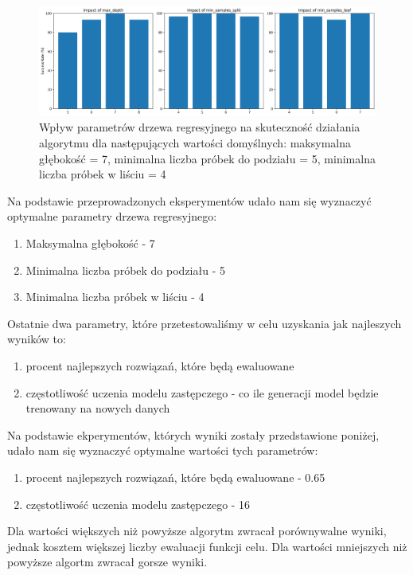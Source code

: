 \documentclass{article}
\begin{document}
\begin{figure}[H]
    \centering
    \includegraphics[width=\textwidth]{tree_parameter_tuning_separate_results3.png}
    \caption{Wpływ parametrów drzewa regresyjnego na skuteczność działania algorytmu dla następujących wartości domyślnych: maksymalna głębokość = 7, minimalna liczba próbek do podziału = 5, minimalna liczba próbek w liściu = 4}
    \label{fig:tree_parameter_results2}
\end{figure}

Na podstawie przeprowadzonych eksperymentów udało nam się wyznaczyć optymalne parametry drzewa regresyjnego:

\begin{enumerate}
    \item Maksymalna głębokość - 7
    \item Minimalna liczba próbek do podziału - 5
    \item Minimalna liczba próbek w liściu - 4
\end{enumerate}

Ostatnie dwa parametry, które przetestowaliśmy w celu uzyskania jak najleszych wyników to:
\begin{enumerate}
    \item procent najlepszych rozwiązań, które będą ewaluowane
    \item częstotliwość uczenia modelu zastępczego - co ile generacji model będzie trenowany na nowych danych
\end{enumerate}

Na podstawie ekperymentów, których wyniki zostały przedstawione poniżej, udało nam się wyznaczyć optymalne wartości tych parametrów:
\begin{enumerate}
    \item procent najlepszych rozwiązań, które będą ewaluowane - 0.65
    \item częstotliwość uczenia modelu zastępczego - 16
\end{enumerate}

Dla wartości większych niż powyższe algorytm zwracał porównywalne wyniki, jednak kosztem większej liczby ewaluacji funkcji celu. Dla wartości mniejszych niż powyższe algortm zwracał gorsze wyniki.
\end{document}
